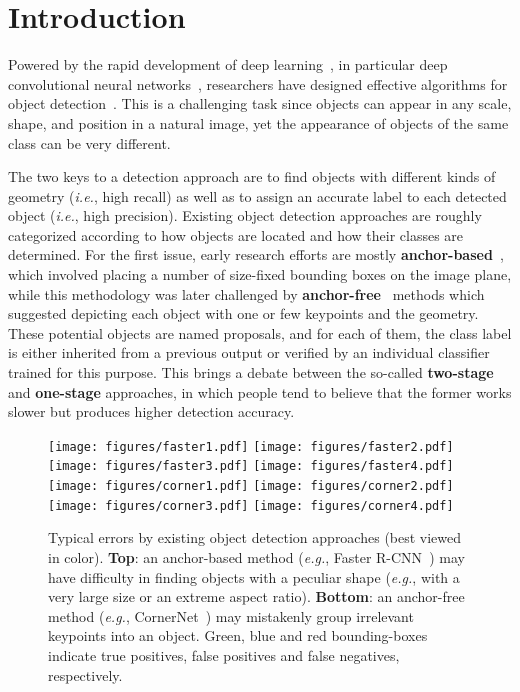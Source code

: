 \documentclass[runningheads]{llncs}
\begin{document}
\section{Introduction}
\label{Introduction}

Powered by the rapid development of deep learning~\cite{lecun2015deep}, in particular deep convolutional neural networks~\cite{krizhevsky2012imagenet,simonyan2014very,he2016deep}, researchers have designed effective algorithms for object detection~\cite{girshick2014rich}. This is a challenging task since objects can appear in any scale, shape, and position in a natural image, yet the appearance of objects of the same class can be very different.

The two keys to a detection approach are to find objects with different kinds of geometry (\textit{i.e.}, high recall) as well as to assign an accurate label to each detected object (\textit{i.e.}, high precision). Existing object detection approaches are roughly categorized according to how objects are located and how their classes are determined. For the first issue, early research efforts are mostly \textbf{anchor-based}~\cite{girshick2015fast,ren2015faster,cai2018cascade,dai2016r,liu2016ssd,lin2017focal,zhang2018single}, which involved placing a number of size-fixed bounding boxes on the image plane, while this methodology was later challenged by \textbf{anchor-free}~\cite{law2018cornernet,duan2019centernet,kong2020foveabox,yang2019reppoints,zhu2019soft,tian2019fcos} methods which suggested depicting each object with one or few keypoints and the geometry. These potential objects are named proposals, and for each of them, the class label is either inherited from a previous output or verified by an individual classifier trained for this purpose. This brings a debate between the so-called \textbf{two-stage} and \textbf{one-stage} approaches, in which people tend to believe that the former works slower but produces higher detection accuracy.

\begin{figure}[t]
\centering 
\texttt{[image: figures/faster1.pdf]}
\texttt{[image: figures/faster2.pdf]}
\texttt{[image: figures/faster3.pdf]}
\texttt{[image: figures/faster4.pdf]}
\texttt{[image: figures/corner1.pdf]}
\texttt{[image: figures/corner2.pdf]}
\texttt{[image: figures/corner3.pdf]}
\texttt{[image: figures/corner4.pdf]}
\caption{Typical errors by existing object detection approaches (best viewed in color). \textbf{Top}: an anchor-based method (\textit{e.g.}, Faster R-CNN~\cite{ren2015faster}) may have difficulty in finding objects with a peculiar shape (\textit{e.g.}, with a very large size or an extreme aspect ratio). \textbf{Bottom}: an anchor-free method (\textit{e.g.}, CornerNet~\cite{law2018cornernet}) may mistakenly group irrelevant keypoints into an object. 
Green, blue and red bounding-boxes indicate true positives, false positives and false negatives, respectively.}
\vspace{-3ex}
\label{fig:detection_errors}
\end{figure}
\end{document}
